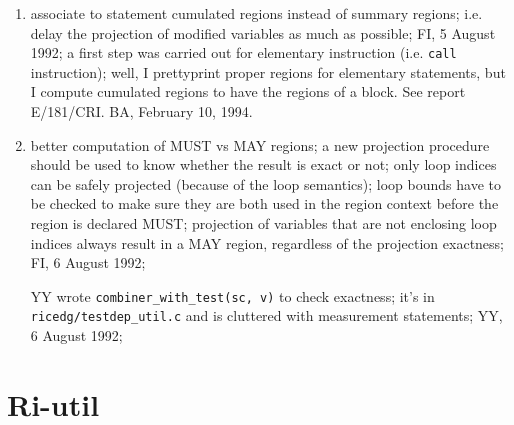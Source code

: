 \begin{enumerate}

  \item associate to statement cumulated regions instead of summary regions;
	i.e. delay the projection of modified variables as much as
	possible; FI, 5 August 1992; a first step was carried out for
	elementary instruction (i.e. \verb+call+ instruction); well, I
	prettyprint proper regions for elementary statements, but I
	compute cumulated regions to have the regions of a block. See
	report E/181/CRI. BA, February 10, 1994.
	

  \item better computation of MUST vs MAY regions; a new projection procedure
	should be used to know whether the result is exact or not; only
	loop indices can be safely projected (because of the loop semantics);
	loop bounds have to be checked to make sure they are both used
	in the region context before the region is declared MUST; projection
	of variables that are not enclosing loop indices always result
	in a MAY region, regardless of the projection exactness;
	FI, 6 August 1992;

	YY wrote \verb+combiner_with_test(sc, v)+ to check exactness;
	it's in \verb+ricedg/testdep_util.c+ and is cluttered with
	measurement statements; YY, 6 August 1992;

\end{enumerate}

\section{Ri-util}

